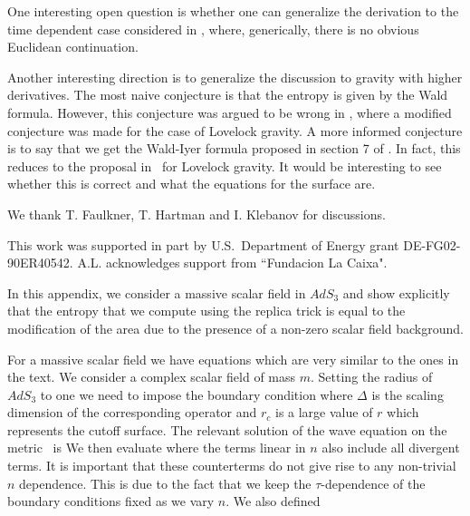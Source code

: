 One interesting open question is whether one can generalize the derivation to the time dependent
case considered in  \HubenyXT , where, generically,
 there is no obvious Euclidean continuation.


Another interesting direction is to generalize the discussion to gravity with higher derivatives. The most
naive conjecture is that
the entropy is given by the Wald formula. However, this conjecture was argued to be wrong in \HungXB , where a modified conjecture was made for the case of Lovelock gravity.
A more informed conjecture is  to say that we get the Wald-Iyer formula proposed in section 7 of
\IyerYS . In fact, this reduces to the proposal in \HungXB\ for  Lovelock gravity. It would be interesting
to see whether this is correct and what the equations for the surface  are.






\noindent
We  thank  T. Faulkner, T. Hartman and I. Klebanov for discussions.

 \noindent
This work was supported in part by U.S.~Department of Energy grant DE-FG02-90ER40542.  A.L. acknowledges support from ``Fundacion La Caixa".



In this appendix, we consider a massive scalar field in $AdS_3$ and show explicitly that
 the  entropy that we compute using the replica trick
  is equal to the modification of the area due to the presence of a non-zero  scalar field background.


For a massive scalar field we have equations which are very similar to the ones in the text. We consider a
complex scalar field of mass $m$. Setting the radius of $AdS_3$ to one we need to impose the boundary condition
\eqn{}
where $\Delta$ is the scaling dimension of the corresponding operator and $r_c$ is a large value of $r$ which represents
the cutoff surface.
The relevant solution of the wave equation on the metric \intb\  is
\eqn{}
We then evaluate
\eqn{}
 where the terms linear in $n$ also include all divergent terms. It is important that these counterterms do not give
 rise to any non-trivial $n$ dependence. This is due to the fact that we keep the $\tau$-dependence of the boundary conditions
 fixed as we vary $n$.
We also defined

